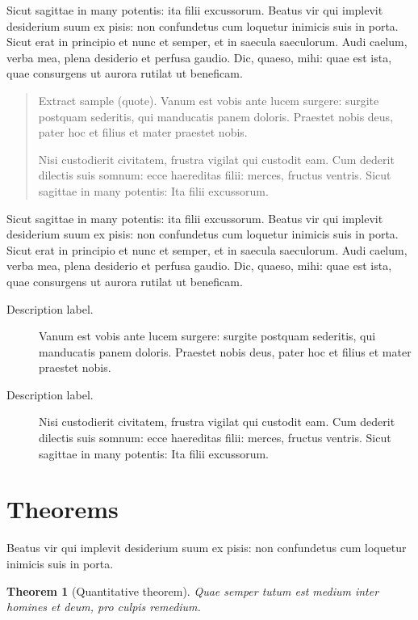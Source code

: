 \documentclass{jdsart}
\theoremstyle{plain}
\newtheorem{thm}{Theorem}
\theoremstyle{remark}
\theoremstyle{definition}
\begin{document}
Sicut sagittae in many potentis: ita filii excussorum. Beatus vir qui
implevit desi\-derium suum ex pisis: non confundetus cum loquetur inimicis
suis in porta.  Sicut erat in principio et nunc et semper, et in saecula
saeculorum. Audi caelum, verba mea, plena desiderio et perfusa gaudio.
Dic, quaeso, mihi: quae est ista, quae consurgens ut aurora rutilat ut
beneficam.

\begin{quote}
Extract sample (quote). Vanum est vobis ante lucem surgere: surgite postquam
sederitis, qui manducatis panem doloris. Praestet nobis deus, pater
hoc et filius et mater praestet nobis.

Nisi custodierit civitatem,
frustra vigilat qui custodit eam. Cum dederit dilectis suis somnum:
ecce haereditas filii: merces, fructus ventris. Sicut sagittae in
many potentis: Ita filii excussorum.
\end{quote}

Sicut sagittae in many potentis: ita filii excussorum. Beatus vir qui
implevit desiderium suum ex pisis: non confundetus cum loquetur inimicis
suis in porta.  Sicut erat in principio et nunc et semper, et in saecula
saeculorum. Audi caelum, verba mea, plena desiderio et perfusa gaudio.
Dic, quaeso, mihi: quae est ista, quae consurgens ut aurora rutilat ut
beneficam.

\begin{description}
\item[Description label.] Vanum est vobis ante lucem surgere: surgite postquam
sederitis, qui manducatis panem doloris. Praestet nobis deus, pater
hoc et filius et mater praestet nobis.

\item[Description label.] Nisi custodierit civitatem,
frustra vigilat qui custodit eam. Cum dederit dilectis suis somnum:
ecce haereditas filii: merces, fructus ventris. Sicut sagittae in
many potentis: Ita filii excussorum.
\end{description}


\section{Theorems}

Beatus vir qui implevit desiderium
suum ex pisis: non confundetus cum loquetur inimicis suis in porta.


\begin{thm}[Quantitative theorem] Quae semper tutum est medium inter homines et deum, 
pro culpis remedium.
\end{thm}
\end{document}
